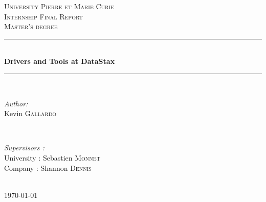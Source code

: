 \documentclass[a4paper]{report}
\begin{document}
\begin{titlepage}

\newcommand{\HRule}{\rule{\linewidth}{0.5mm}} %

\center %
 

\textsc{\LARGE University Pierre et Marie Curie}\\[1.5cm] %
\textsc{\Large Internship Final Report}\\[0.5cm] %
\textsc{\large Master's degree}\\[0.5cm] %


\HRule \\[0.4cm]
{ \huge \bfseries Drivers and Tools at DataStax}\\[0.4cm] %
\HRule \\[1.5cm]
 

\begin{minipage}{0.4\textwidth}
\begin{flushleft} \large
\emph{Author:}\\
Kevin \textsc{Gallardo} %
\end{flushleft}
\end{minipage}
~
\begin{minipage}{0.4\textwidth}
\begin{flushright} \large
\emph{Supervisors :} \\
University : Sebastien \textsc{Monnet} \\
Company : Shannon \textsc{Dennis} %
\end{flushright}
\end{minipage}\\[4cm]


{\large \today}\\[3cm] %


\vfill %

\end{titlepage}
\end{document}
